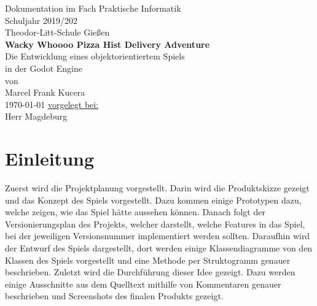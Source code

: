 \documentclass{article}
\begin{document}
	
	\fancyfoot{}
	\fancyhead{}
	\fancyhead[r]{\today}
	\fancyfoot[c]{\thepage}
	
	\thispagestyle{empty}
	\begin{centering}
		\centering
		{\Large Dokumentation im Fach Praktische Informatik}\\
		Schuljahr 2019/202\\
		\vspace{3cm}
		{\Large Theodor-Litt-Schule Gießen}\\
		\vspace{3cm}
		{\Huge \textbf{Wacky Whoooo Pizza Hist Delivery Adventure}}\\
		\vspace{0.5cm}
		{\Large Die Entwicklung eines objektorientiertem Spiels\\in der Godot Engine}\\
		\vspace{3cm}
		{\Large von\\Marcel Frank Kucera}\\
		\vspace{2cm}
		\today
		\vfill
		\hfill \underline{vorgelegt bei:}\\
		\hfill Herr Magdeburg
	\end{centering}

	\newpage
	\tableofcontents
	\thispagestyle{empty}

	\newpage
	
	\section{Einleitung}
	
	Zuerst wird die Projektplanung vorgestellt. Darin wird die Produktskizze gezeigt und das Konzept des Spiels vorgestellt. Dazu kommen einige Prototypen dazu, welche zeigen, wie das Spiel hätte aussehen können. Danach folgt der Versionierungsplan des Projekts, welcher darstellt, welche Features in das Spiel, bei der jeweiligen Versionsnummer implementiert werden sollten. Daraufhin wird der Entwurf des Spiels dargestellt, dort werden einige Klassendiagramme von den Klassen des Spiels vorgestellt und eine Methode per Struktogramm genauer beschrieben. Zuletzt wird die Durchführung dieser Idee gezeigt. Dazu werden einige Ausschnitte aus dem Quelltext mithilfe von Kommentaren genauer beschrieben und Screenshots des finalen Produkts gezeigt.\\
	
\end{document}
